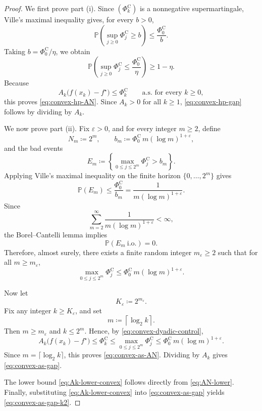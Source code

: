 \documentclass[10pt]{article}
\begin{document}
\begin{proof}
We first prove part (i).
Since \((\Phi_k^{\mathrm C})\) is a nonnegative supermartingale, Ville's maximal inequality gives, for every \(b>0\),
\[
\mathbb P\!\left(\sup_{j\ge 0}\Phi_j^{\mathrm C}\ge b\right)\le \frac{\Phi_0^{\mathrm C}}{b}.
\]
Taking \(b=\Phi_0^{\mathrm C}/\eta\), we obtain
\[
\mathbb P\!\left(\sup_{j\ge 0}\Phi_j^{\mathrm C}\le \frac{\Phi_0^{\mathrm C}}{\eta}\right)\ge 1-\eta.
\]
Because
\[
A_k\bigl(f(x_k)-f^\star\bigr)\le \Phi_k^{\mathrm C}
\qquad\text{a.s. for every }k\ge 0,
\]
this proves \eqref{eq:convex-hp-AN}. Since \(A_k>0\) for all \(k\ge 1\),
\eqref{eq:convex-hp-gap} follows by dividing by \(A_k\).

We now prove part (ii).
Fix \(\varepsilon>0\), and for every integer \(m\ge 2\), define
\[
N_m\coloneqq 2^m,
\qquad
b_m\coloneqq \Phi_0^{\mathrm C}\,m(\log m)^{1+\varepsilon},
\]
and the bad events
\[
E_m
\coloneqq
\left\{
\max_{0\le j\le 2^m}\Phi_j^{\mathrm C}>b_m
\right\}.
\]
Applying Ville's maximal inequality on the finite horizon \(\{0,\dots,2^m\}\) gives
\[
\mathbb P(E_m)\le \frac{\Phi_0^{\mathrm C}}{b_m}
=
\frac{1}{m(\log m)^{1+\varepsilon}}.
\]
Since
\[
\sum_{m=2}^{\infty}\frac{1}{m(\log m)^{1+\varepsilon}}<\infty,
\]
the Borel--Cantelli lemma implies
\[
\mathbb P(E_m\ \mathrm{i.o.})=0.
\]
Therefore, almost surely, there exists a finite random integer
\(m_\varepsilon\ge 2\) such that for all \(m\ge m_\varepsilon\),
\begin{equation}
\label{eq:convex-dyadic-control}
\max_{0\le j\le 2^m}\Phi_j^{\mathrm C}
\le
\Phi_0^{\mathrm C}\,m(\log m)^{1+\varepsilon}.
\end{equation}

Now let
\[
K_\varepsilon\coloneqq 2^{m_\varepsilon}.
\]
Fix any integer \(k\ge K_\varepsilon\), and set
\[
m\coloneqq \left\lceil \log_2 k \right\rceil.
\]
Then \(m\ge m_\varepsilon\) and \(k\le 2^m\). Hence, by \eqref{eq:convex-dyadic-control},
\[
A_k\bigl(f(x_k)-f^\star\bigr)
\le
\Phi_k^{\mathrm C}
\le
\max_{0\le j\le 2^m}\Phi_j^{\mathrm C}
\le
\Phi_0^{\mathrm C}\,m(\log m)^{1+\varepsilon}.
\]
Since \(m=\lceil \log_2 k\rceil\), this proves \eqref{eq:convex-as-AN}. Dividing by \(A_k\) gives \eqref{eq:convex-as-gap}.



The lower bound \eqref{eq:Ak-lower-convex} follows directly from
\eqref{eq:AN-lower}. Finally, substituting \eqref{eq:Ak-lower-convex}
into \eqref{eq:convex-as-gap} yields \eqref{eq:convex-as-gap-k2}.
\end{proof}
\end{document}

